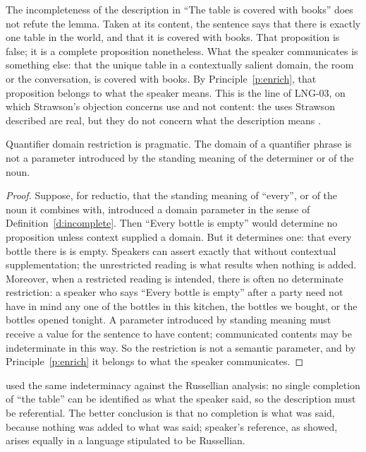 \documentclass{situationist-preprint}
\begin{document}
The incompleteness of the description in \enquote{The table is covered with books} does not refute the lemma. Taken at its content, the sentence says that there is exactly one table in the world, and that it is covered with books. That proposition is false; it is a complete proposition nonetheless. What the speaker communicates is something else: that the unique table in a contextually salient domain, the room or the conversation, is covered with books. By Principle~\ref{p:enrich}, that proposition belongs to what the speaker means. This is the line of LNG-03, on which Strawson's objection concerns use and not content: the uses Strawson described are real, but they do not concern what the description means \citep{Kripke1977,Neale1990}.

\begin{lemma}\label{l:quant}
Quantifier domain restriction is pragmatic. The domain of a quantifier phrase is not a parameter introduced by the standing meaning of the determiner or of the noun.
\end{lemma}

\begin{proof}
Suppose, for reductio, that the standing meaning of \enquote{every}, or of the noun it combines with, introduced a domain parameter in the sense of Definition~\ref{d:incomplete}. Then \enquote{Every bottle is empty} would determine no proposition unless context supplied a domain. But it determines one: that every bottle there is is empty. Speakers can assert exactly that without contextual supplementation; the unrestricted reading is what results when nothing is added. Moreover, when a restricted reading is intended, there is often no determinate restriction: a speaker who says \enquote{Every bottle is empty} after a party need not have in mind any one of the bottles in this kitchen, the bottles we bought, or the bottles opened tonight. A parameter introduced by standing meaning must receive a value for the sentence to have content; communicated contents may be indeterminate in this way. So the restriction is not a semantic parameter, and by Principle~\ref{p:enrich} it belongs to what the speaker communicates.
\end{proof}

\citet{Wettstein1981} used the same indeterminacy against the Russellian analysis: no single completion of \enquote{the table} can be identified as what the speaker said, so the description must be referential. The better conclusion is that no completion is what was said, because nothing was added to what was said; speaker's reference, as \citet{Kripke1977} showed, arises equally in a language stipulated to be Russellian.
\end{document}

